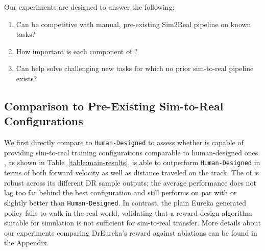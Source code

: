 \documentclass[conference]{IEEEtran}
\newcommand{\jdtext}[1]{\textcolor{black}{#1}}
\begin{document}
\begin{table}
\centering
{}
  \caption{}
  \label{table:leaphand-results}
\end{table}

Our experiments are designed to answer the following:
\begin{enumerate}
    \item Can \ourmethod be competitive with manual, pre-existing Sim2Real pipeline on known tasks?
    \item How important is each component of \ourmethod?
    \item Can \ourmethod help solve challenging new tasks for which no prior sim-to-real pipeline exists? 
\end{enumerate}


\subsection{Comparison to Pre-Existing Sim-to-Real Configurations}
We first directly compare \ourmethod to \texttt{Human-Designed} to assess whether \ourmethod is capable of providing sim-to-real training configurations comparable to human-designed ones. , as shown in Table~\ref{table:main-results}, \ourmethod is able to outperform \texttt{Human-Designed} in terms of both forward velocity as well as distance traveled on the track. The  of \ourmethod is robust across its different DR sample outputs; the average performance does not lag too far behind the best \ourmethod configuration and still \jdtext{performs on par with or slightly better than} \texttt{Human-Designed}. In contrast, the \jdtext{plain} Eureka generated policy fails to walk in the real world, validating that a reward design algorithm suitable for simulation is not sufficient for sim-to-real transfer. More details about our experiments comparing DrEureka’s reward against ablations can be found in the Appendix.
\end{document}
